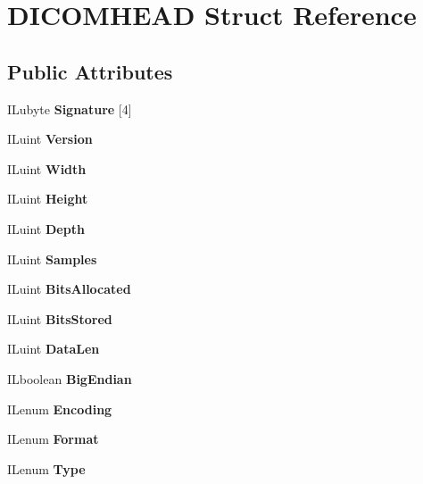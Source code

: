 \hypertarget{structDICOMHEAD}{}\section{D\+I\+C\+O\+M\+H\+E\+AD Struct Reference}
\label{structDICOMHEAD}
\subsection*{Public Attributes}
\begin{DoxyCompactItemize}
\item 
\mbox{\label{structDICOMHEAD_a3a89a3c8488db2ed6387b484ed6fa9e0}} 
I\+Lubyte {\bfseries Signature} \mbox{[}4\mbox{]}
\item 
\mbox{\label{structDICOMHEAD_ad19f1d9236aea3e2da25825f2e90abc1}} 
I\+Luint {\bfseries Version}
\item 
\mbox{\label{structDICOMHEAD_aaf455fc35341ec228931d9d1134c4285}} 
I\+Luint {\bfseries Width}
\item 
\mbox{\label{structDICOMHEAD_a7ca8c8dc7176d3a8f445c688379ac186}} 
I\+Luint {\bfseries Height}
\item 
\mbox{\label{structDICOMHEAD_a936d3cb4cab2c1083a39108a64fd305c}} 
I\+Luint {\bfseries Depth}
\item 
\mbox{\label{structDICOMHEAD_aa5e4fc577459b27e7c1c040ccee1ec92}} 
I\+Luint {\bfseries Samples}
\item 
\mbox{\label{structDICOMHEAD_a075861800012bf75025cc32f9c857ac8}} 
I\+Luint {\bfseries Bits\+Allocated}
\item 
\mbox{\label{structDICOMHEAD_a27bfd7dd23979198b274f5e13635d022}} 
I\+Luint {\bfseries Bits\+Stored}
\item 
\mbox{\label{structDICOMHEAD_a57a13fd14a5a66062df64494d5c93fc6}} 
I\+Luint {\bfseries Data\+Len}
\item 
\mbox{\label{structDICOMHEAD_ad705dab9fd5b9c2d8f5465678ab668bc}} 
I\+Lboolean {\bfseries Big\+Endian}
\item 
\mbox{\label{structDICOMHEAD_ac23a782b19b96219f2d19e0d3fbc7ac2}} 
I\+Lenum {\bfseries Encoding}
\item 
\mbox{\label{structDICOMHEAD_a7952aa01d9c43a7ea5115252ec440778}} 
I\+Lenum {\bfseries Format}
\item 
\mbox{\label{structDICOMHEAD_a38988bce90542ed865c64ab0647a0905}} 
I\+Lenum {\bfseries Type}
\end{DoxyCompactItemize}


